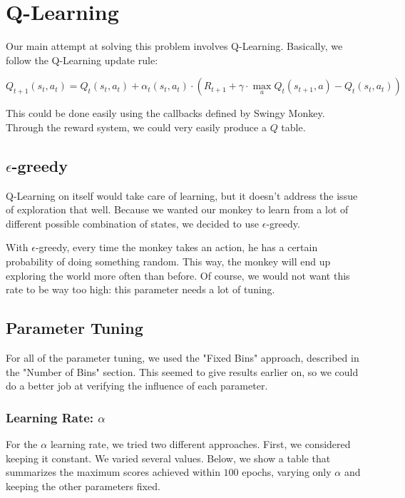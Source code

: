 \documentclass[10pt]{article}
\begin{document}
\section{Q-Learning}

Our main attempt at solving this problem involves Q-Learning. Basically, we
follow the Q-Learning update rule:

\[ Q_{t+1}(s_t, a_t) = Q_{t}(s_t, a_t) + \alpha_t(s_t, a_t) \cdot \left( R_{t+1} + \gamma \cdot \max_a Q_t(s_{t+1}, a) - Q_t(s_t, a_t) \right) \]

\medskip

This could be done easily using the callbacks defined by Swingy Monkey. Through
the reward system, we could very easily produce a $Q$ table.

\subsection{$\epsilon$-greedy}

Q-Learning on itself would take care of learning, but it doesn't address the
issue of exploration that well. Because we wanted our monkey to learn from
a lot of different possible combination of states, we decided to use $\epsilon$-greedy. 

\medskip

With $\epsilon$-greedy, every time the monkey takes an action, he has a certain
probability of doing something random. This way, the monkey will end up exploring
the world more often than before. Of course, we would not want this rate to
be way too high: this parameter needs a lot of tuning.

\subsection{Parameter Tuning}

For all of the parameter tuning, we used the "Fixed Bins" approach, described
in the "Number of Bins" section. This seemed to give results earlier on, so we
could do a better job at verifying the influence of each parameter.

\subsubsection{Learning Rate: $\alpha$}

For the $\alpha$ learning rate, we tried two different approaches. First, we 
considered keeping it constant. We varied several values. Below, we show a table
that summarizes the maximum scores achieved within $100$ epochs, varying only
$\alpha$ and keeping the other parameters fixed.
\end{document}

